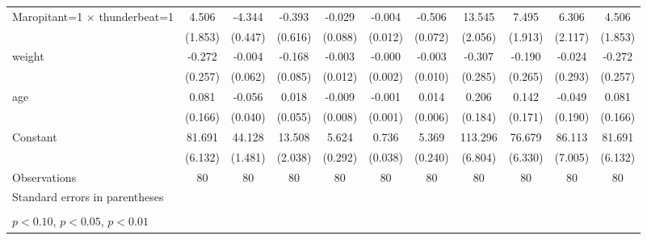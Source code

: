 \begin{table}[htbp]
\begin{tabular}{l*{10}{c}}
\addlinespace
Maropitant=1 $\times$ thunderbeat=1&       4.506\sym{**} &      -4.344\sym{***}&      -0.393         &      -0.029         &      -0.004         &      -0.506\sym{***}&      13.545\sym{***}&       7.495\sym{***}&       6.306\sym{***}&       4.506\sym{**} \\
                    &     (1.853)         &     (0.447)         &     (0.616)         &     (0.088)         &     (0.012)         &     (0.072)         &     (2.056)         &     (1.913)         &     (2.117)         &     (1.853)         \\
\addlinespace
weight              &      -0.272         &      -0.004         &      -0.168\sym{*}  &      -0.003         &      -0.000         &      -0.003         &      -0.307         &      -0.190         &      -0.024         &      -0.272         \\
                    &     (0.257)         &     (0.062)         &     (0.085)         &     (0.012)         &     (0.002)         &     (0.010)         &     (0.285)         &     (0.265)         &     (0.293)         &     (0.257)         \\
\addlinespace
age                 &       0.081         &      -0.056         &       0.018         &      -0.009         &      -0.001         &       0.014\sym{**} &       0.206         &       0.142         &      -0.049         &       0.081         \\
                    &     (0.166)         &     (0.040)         &     (0.055)         &     (0.008)         &     (0.001)         &     (0.006)         &     (0.184)         &     (0.171)         &     (0.190)         &     (0.166)         \\
\addlinespace
Constant            &      81.691\sym{***}&      44.128\sym{***}&      13.508\sym{***}&       5.624\sym{***}&       0.736\sym{***}&       5.369\sym{***}&     113.296\sym{***}&      76.679\sym{***}&      86.113\sym{***}&      81.691\sym{***}\\
                    &     (6.132)         &     (1.481)         &     (2.038)         &     (0.292)         &     (0.038)         &     (0.240)         &     (6.804)         &     (6.330)         &     (7.005)         &     (6.132)         \\
\midrule
Observations        &          80         &          80         &          80         &          80         &          80         &          80         &          80         &          80         &          80         &          80         \\
\bottomrule
\multicolumn{11}{l}{\footnotesize Standard errors in parentheses}\\
\multicolumn{11}{l}{\footnotesize  }\\
\multicolumn{11}{l}{\footnotesize \sym{*} \(p<0.10\), \sym{**} \(p<0.05\), \sym{***} \(p<0.01\)}\\
\end{tabular}
\end{table}
